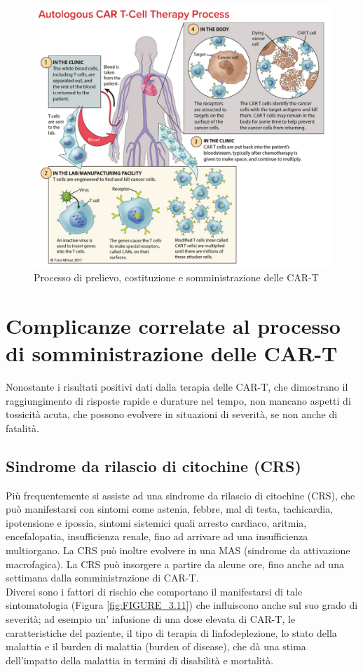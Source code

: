 \begin{figure}[H]
    \begin{center}
    \includegraphics[width=0.8\columnwidth]{img/CART-TherapyProcess.jpeg}
    \end{center}
    \caption{Processo di prelievo, costituzione e somministrazione delle CAR-T
    \cite{LLSCART}}

\end{figure}

\section{Complicanze correlate al processo di somministrazione delle CAR-T}

Nonostante i risultati positivi dati dalla terapia delle CAR-T, che dimostrano il raggiungimento di risposte rapide e 
durature nel tempo, non mancano aspetti di tossicità acuta, che possono evolvere in situazioni di severità, se non 
anche di fatalità\cite{EMATOCART}.\\

\subsection{Sindrome da rilascio di citochine (CRS)}

Più frequentemente si assiste ad una sindrome da rilascio di citochine (CRS), che può manifestarsi con sintomi come 
astenia, febbre, mal di testa, tachicardia, ipotensione e ipossia, sintomi sistemici quali arresto cardiaco, aritmia, 
encefalopatia, insufficienza renale, fino ad arrivare ad una insufficienza multiorgano. La CRS può inoltre evolvere 
in una MAS (sindrome da attivazione macrofagica). 
La CRS può insorgere a partire da alcune ore, fino anche ad una settimana dalla somministrazione di CAR-T.\\
Diversi sono i fattori di rischio che comportano il manifestarsi di tale sintomatologia (Figura \ref{fig:FIGURE_3.11}) che 
influiscono anche sul suo grado di severità; ad esempio un’ infusione di una dose elevata di CAR-T, le caratteristiche 
del paziente, il tipo di terapia di linfodeplezione, lo stato della malattia e il  burden di malattia 
(burden of disease), che dà una stima dell’impatto della malattia in termini di disabilità e mortalità\cite{EMATOCART}.\\

